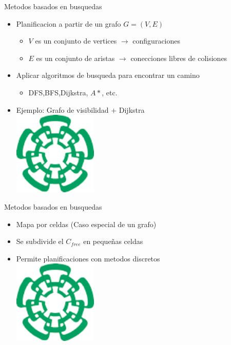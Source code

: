 \documentclass[
	11pt, %
]{beamer}
\begin{document}
\begin{frame}{Metodos basados en busquedas}
  \begin{itemize}
  \item Planificacion a partir de un grafo $G=(V,E)$\\
    \begin{itemize}
    \item $V$ es un conjunto de vertices $\rightarrow$ configuraciones
    \item $E$ es un conjunto de aristas $\rightarrow$ conecciones libres de colisiones
    \end{itemize}
  \item Aplicar algoritmos de busqueda para encontrar un camino\\
    \begin{itemize}
    \item DFS,BFS,Dijkstra, $A*$, etc.
    \end{itemize}
  \item Ejemplo: Grafo de visibilidad $+$ Dijkstra\\
    \centering
    \includegraphics[angle=45,width=4cm]{cinvestavlogo}
  \end{itemize}
\end{frame}

\begin{frame}{Metodos basados en busquedas}
  \begin{itemize}
  \item Mapa por celdas (Caso especial de un grafo)\\
  \item Se subdivide el $C_{free}$ en pequeñas celdas\\
  \item Permite planificaciones con metodos discretos\\
    \centering
    \includegraphics[angle=45,width=4cm]{cinvestavlogo}
  \end{itemize}
\end{frame}
\end{document}
